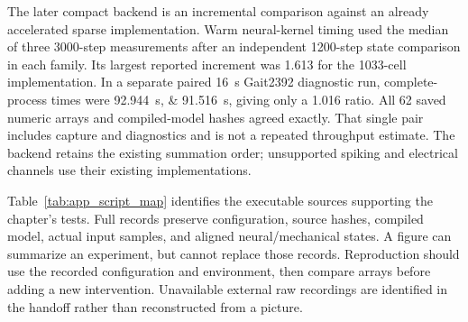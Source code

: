 The later compact backend is an incremental comparison against an already accelerated sparse implementation. Warm neural-kernel timing used the median of three 3000-step measurements after an independent 1200-step state comparison in each family. Its largest reported increment was 1.613 for the 1033-cell implementation. In a separate paired \qty{16}{\second} Gait2392 diagnostic run, complete-process times were \qtylist{92.944;91.516}{\second}, giving only a 1.016 ratio. All 62 saved numeric arrays and compiled-model hashes agreed exactly. That single pair includes capture and diagnostics and is not a repeated throughput estimate. The backend retains the existing summation order; unsupported spiking and electrical channels use their existing implementations.

Table~\ref{tab:app_script_map} identifies the executable sources supporting the chapter's tests. Full records preserve configuration, source hashes, compiled model, actual input samples, and aligned neural/mechanical states. A figure can summarize an experiment, but cannot replace those records. Reproduction should use the recorded configuration and environment, then compare arrays before adding a new intervention. Unavailable external raw recordings are identified in the handoff rather than reconstructed from a picture.

